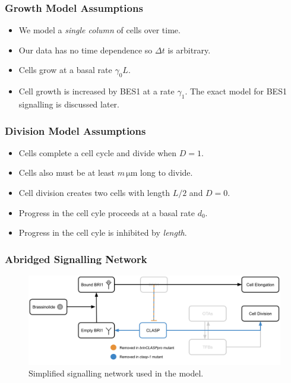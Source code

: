 \documentclass{beamer}
\newcommand{\um}{\unit{\micro\metre}}
\begin{document}
\begin{frame}
\frametitle{Growth Model Assumptions}
\begin{itemize}
    \setlength\itemsep{0.8em}
    \item We model a \emph{single column} of cells over time.
    \item Our data has no time dependence so $\Delta t$ is arbitrary.
    \item Cells grow at a basal rate $\gamma_{0}L$. 
    \item Cell growth is increased by BES1 at a rate $\gamma_{1}$. The exact model for BES1 signalling is discussed later.
\end{itemize}
\end{frame}

\begin{frame}
\frametitle{Division Model Assumptions}
\begin{itemize}
    \setlength\itemsep{0.8em}
    \item Cells complete a cell cycle and divide when $D=1$.
    \item Cells also must be at least $m\,\um$ long to divide.
    \item Cell division creates two cells with length $L / 2$ and $D = 0$.
    \item Progress in the cell cyle proceeds at a basal rate $d_{0}$.
    \item Progress in the cell cyle is inhibited by \emph{length}. 
\end{itemize}
\medskip
\end{frame}

\begin{frame}
\frametitle{Abridged Signalling Network}
\begin{figure}
  \centering
  \includegraphics[width=\textwidth]{network-simplified.png}
  \caption{Simplified signalling network used in the model.}
\end{figure}
\end{frame}
\end{document}
